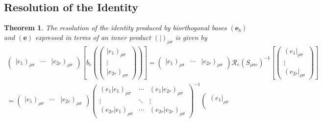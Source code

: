 \documentclass[aps,preprint]{revtex4}
\newtheorem{theorem}{Theorem}
\begin{document}
\subsection{Resolution of the Identity}

\begin{theorem}
The resolution of the identity produced by biorthogonal bases $\left( 
\mathbf{e}_{b}\right) $ and $\left( \mathbf{e}\right) $ expressed in terms
of an inner product $\left( \left. {}\right\vert \right) _{\rho \sigma }$ is
given by 
\begin{gather}
\left( 
\begin{array}{ccc}
\left\vert e_{1}\right) _{\rho \sigma } & \cdots & \left\vert e_{2r}\right)
_{\rho \sigma }%
\end{array}%
\right) \left[ b_{e}\left( \left( 
\begin{array}{c}
\left\vert e_{1}\right) _{\rho \sigma } \\ 
\vdots \\ 
\left\vert e_{2r}\right) _{\rho \sigma }%
\end{array}%
\right) \right) \right] =\left( 
\begin{array}{ccc}
\left\vert e_{1}\right) _{\rho \sigma } & \cdots & \left\vert e_{2r}\right)
_{\rho \sigma }%
\end{array}%
\right) \mathcal{R}_{e}\left( S_{\rho \sigma e}\right) ^{-1}\left[ \left( 
\begin{array}{c}
\left( e_{1}\right\vert _{\rho \sigma } \\ 
\vdots \\ 
\left( e_{2r}\right\vert _{\rho \sigma }%
\end{array}%
\right) \right] \\
=\left( 
\begin{array}{ccc}
\left\vert e_{1}\right) _{\rho \sigma } & \cdots & \left\vert e_{2r}\right)
_{\rho \sigma }%
\end{array}%
\right) \left( 
\begin{array}{ccc}
\left( \left. e_{1}\right\vert e_{1}\right) _{\rho \sigma } & \cdots & 
\left( \left. e_{1}\right\vert e_{2r}\right) _{\rho \sigma } \\ 
\vdots & \ddots & \vdots \\ 
\left( \left. e_{2r}\right\vert e_{1}\right) _{\rho \sigma } & \cdots & 
\left( \left. e_{2r}\right\vert e_{2r}\right) _{\rho \sigma }%
\end{array}%
\right) ^{-1}\left( 
\begin{array}{c}
\left( e_{1}\right\vert _{\rho \sigma } \\ 

\end{array}
\end{gather}
\end{theorem}
\end{document}
